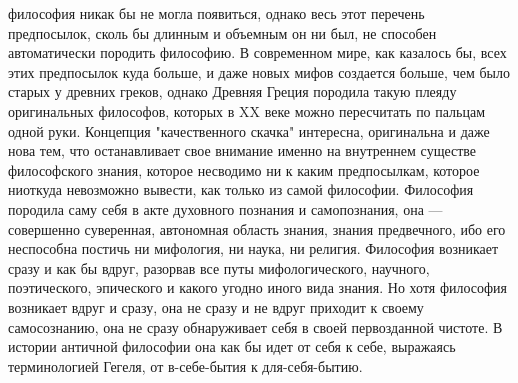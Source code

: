 \documentclass[12pt]{article}
\begin{document}
философия  никак  бы  не  могла  появиться,  однако  весь  этот  перечень  предпосылок,  сколь  бы  длинным  и
объемным он ни был, не способен автоматически породить философию. В современном мире, как казалось бы,
всех этих предпосылок куда больше, и даже новых мифов создается больше, чем было старых у древних греков,
однако  Древняя  Греция  породила  такую  плеяду  оригинальных  философов,  которых  в  XX  веке  можно
пересчитать по пальцам одной руки. 
Концепция "качественного скачка" интересна, оригинальна и даже нова тем, что останавливает свое внимание
именно на внутреннем существе философского знания, которое несводимо ни к каким предпосылкам, которое
ниоткуда невозможно вывести, как только из самой философии. Философия  породила  саму  себя  в  акте
духовного познания и самопознания, она --- совершенно  суверенная,  автономная  область  знания,  знания
предвечного, ибо его неспособна постичь ни мифология, ни наука, ни религия. Философия возникает сразу и
как бы вдруг, разорвав все путы мифологического, научного, поэтического, эпического и какого угодно иного
вида  знания.  Но  хотя  философия  возникает  вдруг  и  сразу,  она  не  сразу  и  не  вдруг  приходит  к  своему
самосознанию, она не сразу обнаруживает себя в своей первозданной чистоте. В истории античной философии
она как бы идет от себя к себе, выражаясь терминологией Гегеля, от в-себе-бытия к для-себя-бытию.

\newpage
\end{document}
